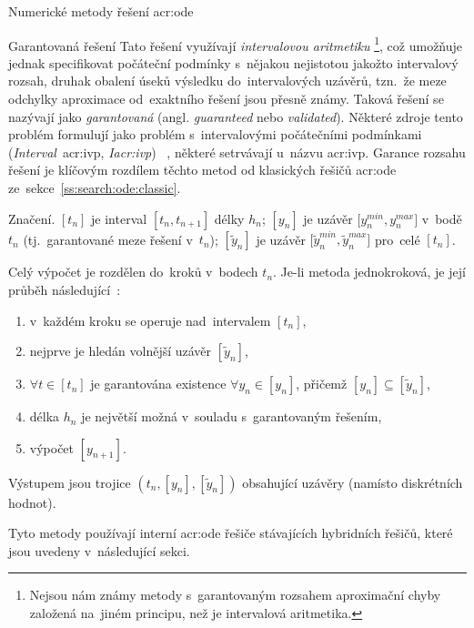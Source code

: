 \documentclass[thesis=M,czech]{FITthesis}[2012/06/26]
\newcommand{\acrlabel}[1]{acr:#1}
\newcommand{\acr}[1]{\acrshort{\acrlabel{#1}}}
\newcommand{\hl}[1]{\textit{#1}}
\newcommand{\name}[1]{\hl{#1}}
\newcommand{\cit}[1]{\cite{#1}}
\newcommand{\rf}[1]{\ref{#1}}
\newcommand{\pred}[1]{\ensuremath{\tilde{#1}}}
\begin{document}
\begin{section}{Numerické metody řešení \acr{ode}}

\begin{subsection}{Garantovaná řešení}\label{ss:search:ode:valid}
Tato řešení využívají \name{intervalovou aritmetiku}%
\footnote{Nejsou nám známy metody s~garantovaným rozsahem aproximační chyby
založená na~jiném principu, než je intervalová aritmetika.},
což umožňuje jednak specifikovat počáteční podmínky
s~nějakou nejistotou jakožto intervalový rozsah,
druhak obalení úseků výsledku do~intervalových uzávěrů,
tzn.~že meze odchylky aproximace od~exaktního řešení
jsou přesně známy.
Taková řešení se nazývají jako \name{garantovaná}
(angl. \name{guaranteed} nebo \name{validated}).
Některé zdroje tento problém formulují
jako problém s~intervalovými počátečními podmínkami
(\name{Interval}~\acr{ivp}, \name{I\acr{ivp}})%
~\cit{ode-valid-runge_kutta-art},
některé setrvávají u~názvu \acr{ivp}.
Garance rozsahu řešení je klíčovým rozdílem
těchto metod
od klasických řešičů \acr{ode}
ze~sekce~\rf{ss:search:ode:classic}.


\begin{paragraph}{Značení.}\label{p:search:ode:sign}
${[t_n]}$ je interval ${[t_{n}, t_{n+1}]}$ délky $h_n$;
${[y_n]}$ je uzávěr ${[y^{min}_{n}, y^{max}_{n}}]$ v~bodě $t_n$
(tj.~garantované meze řešení v~$t_n$);
${[\pred{y}_n]}$ je uzávěr ${[\pred{y}^{min}_{n}, \pred{y}^{max}_{n}}]$
pro~celé ${[t_n]}$.
\end{paragraph} %


\bigskip

Celý výpočet je rozdělen do~kroků v~bodech $t_n$.
Je-li metoda jednokroková,
je její průběh následující~\cit{ode-valid-runge_kutta-art}:
\begin{enumerate}
\item v~každém kroku se operuje nad~intervalem ${[t_{n}]}$,
\item nejprve je hledán volnější uzávěr ${[\pred{y}_n]}$,
\item ${\forall t \in [t_n]}$ je garantována existence
   ${\forall y_n \in [y_n]}$, přičemž
   ${[y_n] \subseteq [\pred{y}_n]}$,
\item délka $h_n$ je největší možná v~souladu s~garantovaným řešením,
\item výpočet ${[y_{n+1}]}$.
\end{enumerate}
Výstupem jsou trojice ${(t_n, [y_n], [\pred{y}_n])}$
obsahující uzávěry (namísto diskrétních hodnot).

Tyto metody používají interní \acr{ode} řešiče
stávajících hybridních řešičů,
které jsou uvedeny v~následující sekci.
\end{subsection} %


\end{section} %
\end{document}
